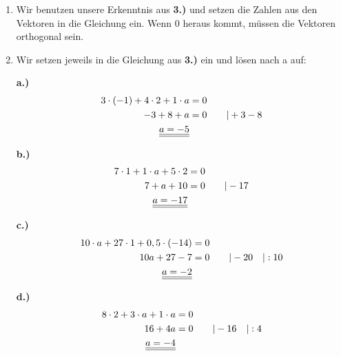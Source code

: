 \begin{enumerate}
		\item Wir benutzen unsere Erkenntnis aus \textbf{3.)} und setzen die Zahlen aus den Vektoren in die Gleichung ein. Wenn 0 heraus kommt, müssen die Vektoren orthogonal sein.
		
		
		\item
		Wir setzen jeweils in die Gleichung aus \textbf{3.)} ein und lösen nach a auf:
		\item[\textbf{a.)}] 
		\begin{align*}
			3\cdot(-1) + 4\cdot2 + 1\cdot a &= 0 \\
			-3 + 8 + a &= 0 	\qquad | +3 -8  \\
			\underline{\underline{a = -5}}
		\end{align*}
		\item[\textbf{b.)}] 
		\begin{align*}
			7\cdot1+1\cdot a+5\cdot2&=0\\
			7+a+10&=0 			\qquad |-17\\
			\underline{\underline{a=-17}}
		\end{align*}
		\item[\textbf{c.)}]
		\begin{align*}
				10\cdot a+27\cdot1+0,5\cdot(-14)&=0\\
			10a+27-7&=0 		\qquad |-20\quad |:10\\
			\underline{\underline{a=-2}}
		\end{align*}
              \item[\textbf{d.)}] 
		\begin{align*}
			8\cdot2+3\cdot a+1\cdot a &=0 \\
			16+4a &=0 			\qquad |-16 \quad |:4\\
			\underline{\underline{a=-4}}
		\end{align*}
	\end{enumerate}
	
